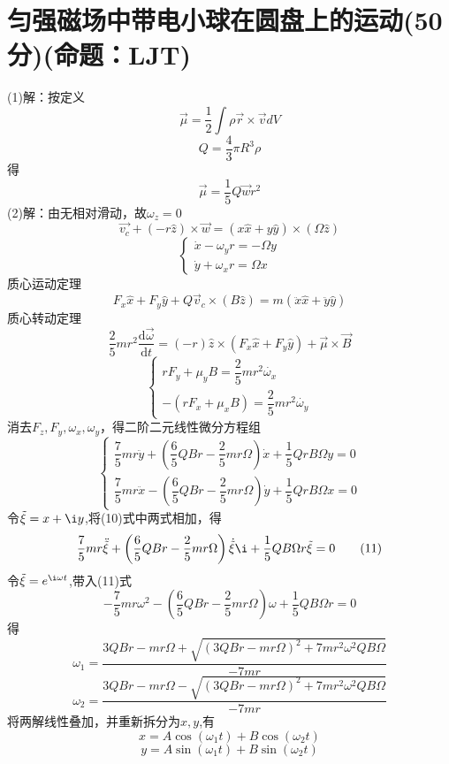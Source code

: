 \documentclass{article}
\begin{document}
\section*{匀强磁场中带电小球在圆盘上的运动(50分)(命题：LJT)}
\[\]
(1)解：按定义
\[\vec{\mu }=\dfrac{1}{2}\int \rho \vec{r}\times \vec{v}dV\tag{1}\]
\[Q=\dfrac{4}{3}\pi R^{3}\rho\tag{2}\]
得
\[\vec{\mu }=\dfrac{1}{5}Q\vec{w}r^{2}\tag{3}\]
(2)解：由无相对滑动，故$\omega_z=0$
\[\vec{v_{c}}+\left( -r\hat{z}\right) \times \vec{w}=\left( x\hat{x}+y\hat{y}\right) \times \left( \Omega \hat{z}\right) \tag{4}\]
\[
\begin{cases}
    \dot{x}-\omega_{y}r=-\Omega y\\
    \dot{y}+\omega_{x} r=\Omega x
\end{cases}
\tag{5}
\]
质心运动定理
\[
F_x \hat{x}+F_y\hat{y}+Q\vec{v}_{c}\times \left( B\hat{z}\right) =m\left( \ddot{x}\hat{x}+ \ddot{y}\hat{y}\right)
\tag{7}
\]
质心转动定理
\[
\dfrac{2}{5}mr^{2}\dfrac{\mathrm{d}\vec{\omega}}{\mathrm{d}t}=\left( -r\right) \hat{z}\times \left( F_{x}\hat{x}+F_{y}\hat{y}\right) +\vec{\mu }\times \vec{B}
\tag{8}
\]
\[
\begin{cases}
    rF_y+\mu _{y}B=\dfrac{2}{5}mr^{2}\dot{\omega_x}\\
    -\left( rF_{x}+\mu _{x}B\right) =\dfrac{2}{5}mr^{2}\dot{\omega_y}
\end{cases}
\tag{9}
\]
消去$F_z,F_y,\omega_x,\omega_y$，得二阶二元线性微分方程组
\[
\begin{cases}
    \dfrac{7}{5}mr\ddot{y}+\left( \dfrac{6}{5}QBr-\dfrac{2}{5}mr\Omega \right) \dot{x}+\dfrac{1}{5}QrB\Omega y=0\\
    \dfrac{7}{5}mr\ddot{x}-\left( \dfrac{6}{5}QBr-\dfrac{2}{5}mr\Omega \right) \dot{y}+\dfrac{1}{5}QrB\Omega x=0
\end{cases}
\tag{10}
\]
令$\tilde{\xi}=x+\i y$,将(10)式中两式相加，得
\[
\dfrac{7}{5}mr\ddot{\tilde{\xi}}+\left( \dfrac{6}{5}QBr-\dfrac{2}{5}mr\Omega \right)\dot{\tilde{\xi}}\i+\dfrac{1}{5}QB\Omega r\tilde{\xi}=0
\tag{11}
\]
令$\tilde{\xi}=e^{\i\omega t}$,带入(11)式
\[
-\dfrac{7}{5}mr\omega ^{2}-\left( \dfrac{6}{5}QBr -\dfrac{2}{5}mr\Omega \right) \omega +\dfrac{1}{5}QB\Omega r=0
\tag{12}
\]
得
\[
\omega_{1}=\dfrac{3QBr-mr\Omega +\sqrt{\left( 3QBr-mr\Omega \right) ^{2}+7mr^{2}\omega^{2}QB\Omega }}{-7mr}
\tag{13}
\]
\[
\omega_{2}=\dfrac{3QBr-mr\Omega -\sqrt{\left( 3QBr-mr\Omega \right) ^{2}+7mr^{2}\omega^{2}QB\Omega }}{-7mr}
\tag{14}
\]
将两解线性叠加，并重新拆分为$x,y$,有
\[
x=A\cos \left( \omega _{1}t\right) +B\cos\left( \omega_{2}t\right)
\]
\[
y=A\sin \left( \omega _{1}t\right) +B\sin\left( \omega_{2}t\right)
\]
\end{document}
